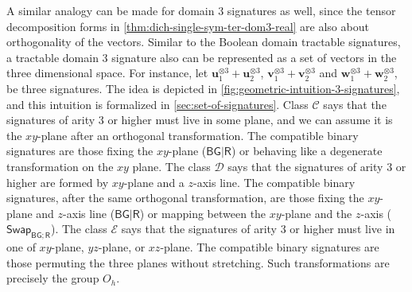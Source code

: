 \documentclass[11pt]{article}
\newcommand{\db}{\mathsf{B}}
\newcommand{\dg}{\mathsf{G}}
\newcommand{\dr}{\mathsf{R}}
\newcommand{\swhelper}[1]{$\mathsf{Swap}_{#1}$\xspace}
\newcommand{\swbg}{\swhelper{\db \dg; \dr}}
\newcommand{\teh}{^{\otimes 3}}
\newcommand{\tractBG}{$\mathscr{C}$\xspace}
\newcommand{\tractBGR}{$\mathscr{D}$\xspace}
\newcommand{\tractBGGRBR}{$\mathscr{E}$\xspace}
\begin{document}
A similar analogy can be made for domain $3$ signatures as well, since the tensor decomposition forms in \cref{thm:dich-single-sym-ter-dom3-real} are also about orthogonality of the vectors. 
Similar to the Boolean domain tractable signatures, a tractable domain $3$ signature also can be represented as a set of vectors in the three dimensional space.
For instance, let $\mathbf{u}_1\teh + \mathbf{u}_2\teh$, $\mathbf{v}_1\teh + \mathbf{v}_2\teh$ and $\mathbf{w}_1\teh + \mathbf{w}_2\teh$, 
be three signatures.
The idea is depicted in \cref{fig:geometric-intuition-3-signatures}, and this intuition is formalized in \cref{sec:set-of-signatures}.
Class \tractBG says that the signatures of arity $3$ or higher must live in 
some plane, and we can assume it is the $xy$-plane after an orthogonal transformation.
The compatible binary signatures are those fixing the $xy$-plane ($\db \dg | \dr$) or 
behaving like a degenerate transformation on the $xy$ plane.
The class \tractBGR says that the signatures of arity $3$ or higher are formed by $xy$-plane and a $z$-axis line.
The compatible binary signatures, after the same orthogonal transformation,
are those fixing the $xy$-plane and $z$-axis line ($\db \dg | \dr$) or mapping between the $xy$-plane and the $z$-axis (\swbg).
The class \tractBGGRBR says that the signatures of arity $3$ or higher must live in one of $xy$-plane, $yz$-plane, or $xz$-plane.
The compatible binary signatures are those permuting the three planes without stretching. 
Such transformations are precisely the group $O_h$.
\end{document}

